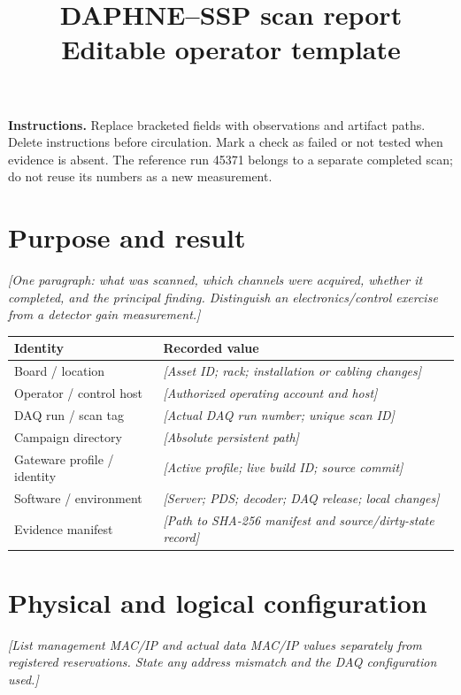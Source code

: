 \documentclass[11pt,a4paper]{article}
\title{DAPHNE--SSP scan report\\\large Editable operator template}
\author{\entry{Operator and institute}}
\date{\entry{Date, time range, and time zone}}
\newcommand{\entry}[1]{\textcolor{blue!60!black}{\textit{[#1]}}}
\begin{document}
\maketitle
\textbf{Instructions.} Replace bracketed fields with observations and artifact paths. Delete instructions before circulation. Mark a check as failed or not tested when evidence is absent. The reference run 45371 belongs to a separate completed scan; do not reuse its numbers as a new measurement.

\section{Purpose and result}
\entry{One paragraph: what was scanned, which channels were acquired, whether it completed, and the principal finding. Distinguish an electronics/control exercise from a detector gain measurement.}

\begin{tabularx}{\linewidth}{@{}lX@{}}\toprule
Identity & Recorded value \\\midrule
Board / location & \entry{Asset ID; rack; installation or cabling changes} \\
Operator / control host & \entry{Authorized operating account and host} \\
DAQ run / scan tag & \entry{Actual DAQ run number; unique scan ID} \\
Campaign directory & \entry{Absolute persistent path} \\
Gateware profile / identity & \entry{Active profile; live build ID; source commit} \\
Software / environment & \entry{Server; PDS; decoder; DAQ release; local changes} \\
Evidence manifest & \entry{Path to SHA-256 manifest and source/dirty-state record} \\\bottomrule
\end{tabularx}

\section{Physical and logical configuration}
\entry{List management MAC/IP and actual data MAC/IP values separately from registered reservations. State any address mismatch and the DAQ configuration used.}
\end{document}
